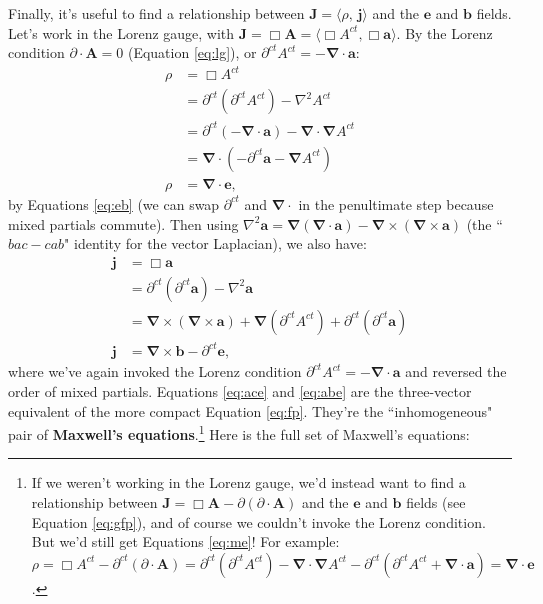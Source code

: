 \documentclass[12pt]{article}
\renewcommand{\vv}[1]{\mathbf{#1}}
\newcommand{\del}{\boldsymbol{\nabla}}
\begin{document}
Finally, it's useful to find a relationship between $\vv J = \langle \rho, \, \vv j \rangle$ and the $\vv e$ and $\vv b$ fields. Let's work in the Lorenz gauge, with $\vv J= \Box \vv A = \langle \Box A^{ct}, \Box \vv a \rangle$. By the Lorenz condition ${\partialup \cdot \vv A = 0}$ (Equation \ref{eq:lg}), or $\partial^{ct} A^{ct} = - \del \cdot \vv a$:
\begin{equation}\label{eq:ace}
\begin{split}
\rho &= \Box A^{ct} \\
&= \partial^{ct} (\partial^{ct} A^{ct}) - \nabla ^2 A^{ct} \\
&= \partial^{ct} (- \del \cdot \vv a) - \del \cdot \del A^{ct} \\
&= \del \cdot (- \partial^{ct} \vv a - \del A^{ct}) \\
\rho &= \del \cdot \vv e ,
\end{split}
\end{equation}
by Equations \ref{eq:eb} (we can swap $\partial^{ct}$ and $\del \cdot$ in the penultimate step because mixed partials commute). Then using ${\nabla ^2 \vv a = \del(\del \cdot \vv a) - \del \times (\del \times \vv a)}$ (the ``$bac - cab$" identity for the vector Laplacian), we also have:
\begin{equation}\label{eq:abe}
\begin{split}
\vv j &= \Box \vv a \\
&= \partial^{ct} (\partial^{ct} \vv a) - \nabla ^2 \vv a \\
&= \del \times (\del \times \vv a) + \del(\partial^{ct} A^{ct}) + \partial^{ct} (\partial^{ct} \vv a) \\
\vv j &=  \del \times \vv b - \partial^{ct} \vv e ,
\end{split}
\end{equation}
where we've again invoked the Lorenz condition $\partial^{ct} A^{ct} = - \del \cdot \vv a$ and reversed the order of mixed partials. Equations \ref{eq:ace} and \ref{eq:abe} are the three-vector equivalent of the more compact Equation \ref{eq:fp}. They're the ``inhomogeneous" pair of \textbf{Maxwell's equations}.\footnote{If we weren't working in the Lorenz gauge, we'd instead want to find a relationship between $\vv J = \Box \vv A - \partialup (\partialup \cdot \vv A)$ and the $\vv e$ and $\vv b$ fields (see Equation \ref{eq:gfp}), and of course we couldn't invoke the Lorenz condition. But we'd still get Equations \ref{eq:me}! For example: $\rho = \Box A^{ct} - \partial^{ct}(\partialup \cdot \vv A) = \partial^{ct} (\partial^{ct} A^{ct}) - \del \cdot \del A^{ct} - \partial^{ct} (\partial^{ct} A^{ct} + \del \cdot \vv a) = \del \cdot \vv e$.} Here is the full set of Maxwell's equations:
\end{document}
